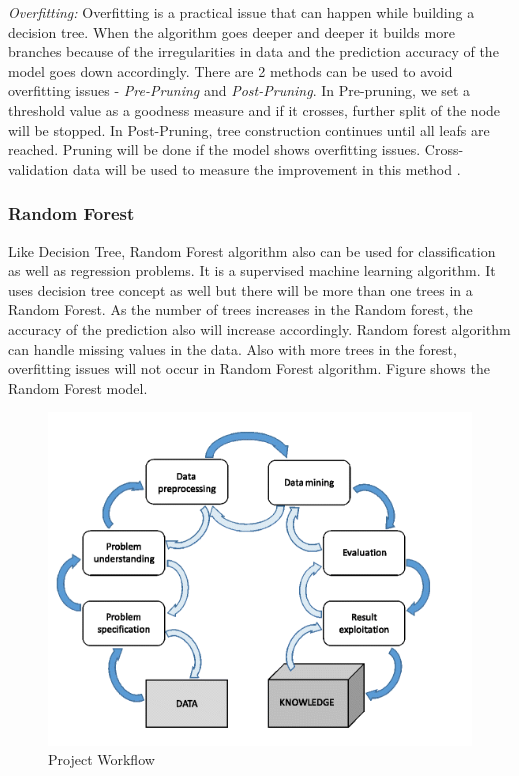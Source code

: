 \documentclass[sigconf]{acmart}
\begin{document}
\textit{Overfitting:} Overfitting is a practical issue that can happen while building a decision tree. When the algorithm goes deeper and deeper it builds more branches because of the irregularities in data and the prediction accuracy of the model goes down accordingly. There are 2 methods can be used to avoid overfitting issues - \emph{Pre-Pruning} and \emph{Post-Pruning}. In Pre-pruning, we set a threshold value as a goodness measure and if it crosses, further split of the node will be stopped. In Post-Pruning, tree construction continues until all leafs are reached. Pruning will be done if the model shows overfitting issues. Cross-validation data will be used to measure the improvement in this method \cite{decision-tree}.

\subsubsection{Random Forest}

Like Decision Tree, Random Forest algorithm also can be used for classification as well as regression problems. It is a supervised machine learning algorithm. It uses decision tree concept as well but there will be more than one trees in a Random Forest. As the number of trees increases in the Random forest, the accuracy of the prediction also will increase accordingly. Random forest algorithm can handle missing values in the data. Also with more trees in the forest, overfitting issues will not occur in Random Forest algorithm. Figure shows the Random Forest model.

\begin{figure}[htb]
  \centering
  \includegraphics[width=1.0\columnwidth]{project/images/Figure1.png}
  \caption{Project Workflow
  \cite{preprocessing}}
  \label{fig:Figure1} 
\end{figure}
\end{document}

